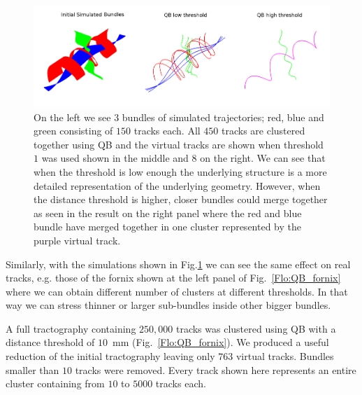 \documentclass[preprint,authoryear,a4paper,10pt,onecolumn]{elsarticle}
\begin{document}
\begin{figure}
\begin{centering}
\includegraphics[scale=0.7]{Fig_5_helix_phantom}
\par\end{centering}
\caption{On the left we see $3$ bundles of simulated trajectories; red,
  blue and green consisting of $150$ tracks each. All $450$ tracks are
  clustered together using QB and the virtual tracks are shown when
  threshold $1$ was used shown in the middle and $8$ on the right.  We
  can see that when the threshold is low enough the underlying structure
  is a more detailed representation of the underlying geometry. However,
  when the distance threshold is higher, closer bundles could merge
  together as seen in the result on the right panel where the red and
  blue bundle have merged together in one cluster represented by the
  purple virtual track.\label{Flo:simulated_orbits}}
\end{figure}

Similarly, with the simulations shown in Fig.\ref{Flo:simulated_orbits}
we can see the same effect on real tracks, e.g. those of the fornix
shown at the left panel of Fig.~\ref{Flo:QB_fornix} where we can obtain
different number of clusters at different thresholds. In that way we can
stress thinner or larger sub-bundles inside other bigger bundles. 

A full tractography containing $250,000$ tracks was clustered using QB
with a distance threshold of $10$~mm (Fig.~\ref{Flo:QB_fornix}).  We
produced a useful reduction of the initial tractography leaving only
$763$ virtual tracks. Bundles smaller than $10$ tracks were
removed. Every track shown here represents an entire cluster containing
from $10$ to $5000$ tracks each.
\end{document}
